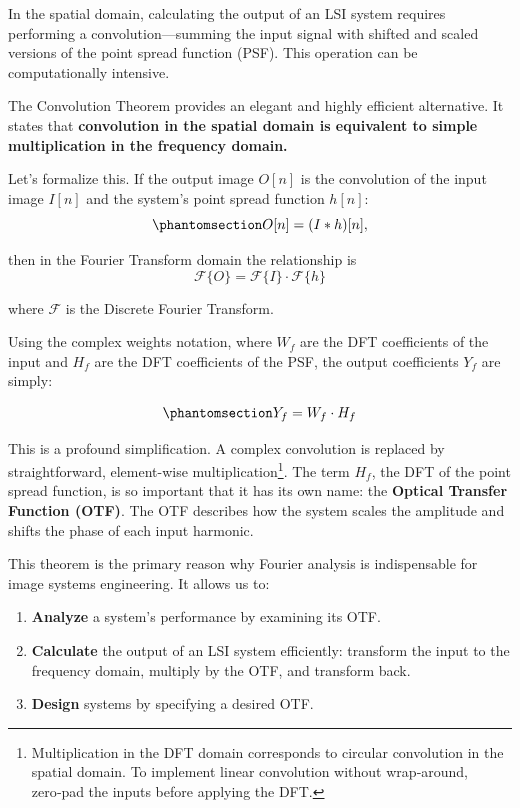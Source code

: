 \documentclass[
  letterpaper,
]{book}
\providecommand{\tightlist}{%
  \setlength{\itemsep}{0pt}\setlength{\parskip}{0pt}}\usepackage{longtable,booktabs,array}
\begin{document}
In the spatial domain, calculating the output of an LSI system requires
performing a convolution---summing the input signal with shifted and
scaled versions of the point spread function (PSF). This operation can
be computationally intensive.

The Convolution Theorem provides an elegant and highly efficient
alternative. It states that \textbf{convolution in the spatial domain is
equivalent to simple multiplication in the frequency domain.}

Let's formalize this. If the output image \(O[n]\) is the convolution of
the input image \(I[n]\) and the system's point spread function
\(h[n]\):
\begin{equation}\phantomsection\label{eq-convolution-theorem-1}{
O[n] = (I * h)[n],
}\end{equation}

then in the Fourier Transform domain the relationship is \[
\mathscr{F}\{O\} = \mathscr{F}\{I\} \cdot \mathscr{F}\{h\}
\]

where \(\mathscr{F}\) is the Discrete Fourier Transform.

Using the complex weights notation, where \(W_f\) are the DFT
coefficients of the input and \(H_f\) are the DFT coefficients of the
PSF, the output coefficients \(Y_f\) are simply:

\begin{equation}\phantomsection\label{eq-convolution-theorem-2}{
Y_f = W_f \cdot H_f
}\end{equation}

This is a profound simplification. A complex convolution is replaced by
straightforward, element-wise multiplication\footnote{Multiplication in
  the DFT domain corresponds to circular convolution in the spatial
  domain. To implement linear convolution without wrap‑around, zero‑pad
  the inputs before applying the DFT.}. The term \(H_f\), the DFT of the
point spread function, is so important that it has its own name: the
\textbf{Optical Transfer Function (OTF)}. The OTF describes how the
system scales the amplitude and shifts the phase of each input harmonic.

This theorem is the primary reason why Fourier analysis is indispensable
for image systems engineering. It allows us to:

\begin{enumerate}
\def\labelenumi{\arabic{enumi}.}
\tightlist
\item
  \textbf{Analyze} a system's performance by examining its OTF.
\item
  \textbf{Calculate} the output of an LSI system efficiently: transform
  the input to the frequency domain, multiply by the OTF, and transform
  back.
\item
  \textbf{Design} systems by specifying a desired OTF.
\end{enumerate}
\end{document}
